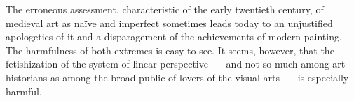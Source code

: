 The erroneous assessment, characteristic of the early twentieth century, of medieval art
as na\"ive and imperfect sometimes leads today to an unjustified apologetics of it and a
disparagement of the achievements of modern painting.  The harmfulness of both
extremes is easy to see.  It seems, however, that the fetishization of the system of
linear perspective~--- and not so much among art historians as among the broad public
of lovers of the visual arts~--- is especially harmful.
